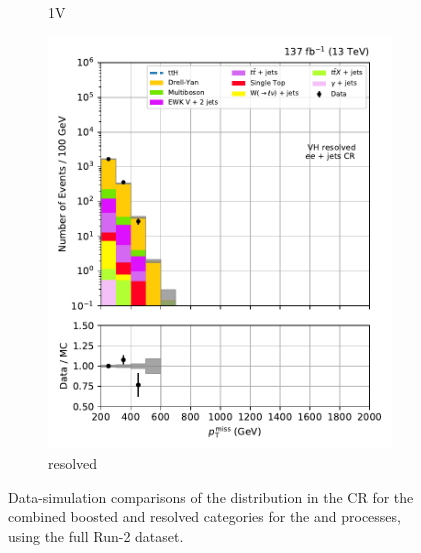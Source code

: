\begin{figure}[htbp]
\begin{subfigure}[b]{0.24\textwidth}
        \caption{\VH 1V}
    \end{subfigure}
    \hfill
    \begin{subfigure}[b]{0.24\textwidth}
        \includegraphics[width=\textwidth]{figures/region_plots/full_Run2/region_4/VH_resolved.pdf}
        \caption{\VH resolved}
    \end{subfigure}
    \caption[Data-simulation comparisons of the \ptmiss distribution in the \doubleEleCr control region for the combined boosted and resolved categories for the \ttH and \VH processes, using the full Run-2 dataset]{Data-simulation comparisons of the \ptmiss distribution in the \doubleEleCr \gls{CR} for the combined boosted and resolved categories for the \ttH and \VH processes, using the full Run-2 dataset.}
    \label{fig:htoinv_cr_yields_comb2016to18_double_electron}
\end{figure}

